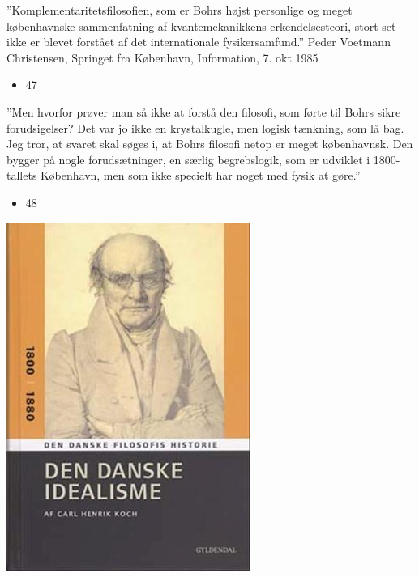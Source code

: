 \documentclass{beamer}
\begin{document}
\begin{frame}{”Komplementaritetsfilosofien, som er Bohrs højst personlige og meget københavnske sammenfatning af kvantemekanikkens erkendelsesteori, stort set ikke er blevet forstået af det internationale fysikersamfund.”
 Peder Voetmann Christensen, Springet fra København, Information,  7. okt 1985}
\begin{itemize}
  \item 47
\end{itemize}
\end{frame}
\begin{frame}{”Men hvorfor prøver man så ikke at forstå den filosofi, som førte til Bohrs sikre forudsigelser? Det var jo ikke en krystalkugle, men logisk tænkning, som lå bag.
Jeg tror, at svaret skal søges i, at Bohrs filosofi netop er meget københavnsk. Den bygger på nogle forudsætninger, en særlig begrebslogik, som er udviklet i 1800-tallets København, men som ikke specielt har noget med fysik at gøre.”}
\begin{itemize}
  \item 48
\end{itemize}
\end{frame}
\begin{frame}{49}
\includegraphics[width=0.9\linewidth]{slide49_img13.jpg}
\end{frame}
\end{document}
